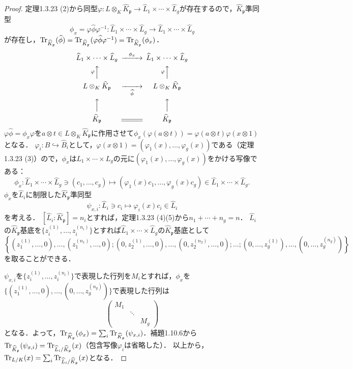 \begin{proof}
  定理1.3.23 (2)から同型$\varphi \colon L \otimes_K \widehat{K}_\mathfrak{p} \to \widehat{L}_1 \times \cdots \times \widehat{L}_g$が存在するので，$\widehat{K}_\mathfrak{p}$準同型
  \[\phi_x=\varphi\widehat{\phi}\varphi^{-1} \colon \widehat{L}_1\times\cdots\times\widehat{L}_g\to \widehat{L}_1\times\cdots\times\widehat{L}_g\]
  が存在し，$\operatorname{Tr}_{\widehat{K}_\mathfrak{p}}(\widehat{\phi})=\operatorname{Tr}_{\widehat{K}_\mathfrak{p}}(\varphi\widehat{\phi}\varphi^{-1})=\operatorname{Tr}_{\widehat{K}_\mathfrak{p}}(\phi_x)$．
  \[
  \begin{CD}
    \widehat{L}_1\times\cdots\times\widehat{L}_g @>{\phi_x}>> \widehat{L}_1\times\cdots\times\widehat{L}_g\\
    @A{\varphi}AA  @A{\varphi}AA\\
    L\otimes_K\widehat{K}_\mathfrak{p} @>>{\widehat{\phi}}> L\otimes_K\widehat{K}_\mathfrak{p}\\
    @AAA @AAA\\
    \widehat{K}_\mathfrak{p} @= \widehat{K}_\mathfrak{p}
  \end{CD}
  \]
  $\varphi\widehat{\phi}=\phi_x\varphi$を$a\otimes t\in L\otimes_K\widehat{K}_\mathfrak{p}$に作用させて$\phi_x(\varphi(a\otimes t)) = \varphi(a\otimes t)\varphi(x\otimes1)$となる．
  $\varphi_i \colon B\hookrightarrow\widehat{B}_i$として，$\varphi(x\otimes1) = (\varphi_1(x), \ldots, \varphi_g(x))$である（定理1.3.23 (3)）ので，$\phi_x$は$L_1\times\cdots\times L_g$の元に$(\varphi_1(x), \ldots, \varphi_g(x))$をかける写像である：
  \[\phi_x\colon\widehat{L}_1\times\cdots\times\widehat{L}_g\ni (c_1,\ldots,c_g)\mapsto(\varphi_1(x)c_1, \ldots, \varphi_g(x)c_g)\in \widehat{L}_1\times\cdots\times\widehat{L}_g.\]
  $\phi_x$を$\widehat{L}_i$に制限した$\widehat{K}_\mathfrak{p}$準同型
  \[\psi_{x,i}\colon\widehat{L}_i\ni c_i\mapsto \varphi_i(x)c_i\in\widehat{L}_i\]
  を考える．
  $[\widehat{L}_i:\widehat{K}_\mathfrak{p}]=n_i$とすれば，定理1.3.23 (4)(5)から$n_1+\cdots+n_g=n$．
  $\widehat{L}_i$の$\widehat{K}_\mathfrak{p}$基底を$\{z_i^{(1)},\ldots,z_i^{(n_i)}\}$とすれば$\widehat{L}_1\times\cdots\times\widehat{L}_g$の$\widehat{K}_\mathfrak{p}$基底として
  \[\left\{(z_1^{(1)},\ldots,0),\ldots,(z_1^{(n_1)},\ldots,0);(0,z_2^{(1)},\ldots,0),\ldots,(0,z_2^{(n_2)},\ldots,0);\ldots;(0,\ldots,z_g^{(1)}),\ldots,(0,\ldots,z_g^{(n_g)})\right\}\]
  を取ることができる．

  $\psi_{x,i}$を$\{z_i^{(1)},\ldots,z_i^{(n_i)}\}$で表現した行列を$M_i$とすれば，$\phi_x$を$\{(z_1^{(1)},\ldots,0),\ldots,(0,\ldots,z_g^{(n_g)})\}$で表現した行列は
  \[
  \begin{pmatrix}
    M_1 &        & \\
    & \ddots & \\
    &        & M_g
  \end{pmatrix}
  \]
  となる．よって，$\operatorname{Tr}_{\widehat{K}_\mathfrak{p}}(\phi_x)=\sum_i\operatorname{Tr}_{\widehat{K}_\mathfrak{p}}(\psi_{x,i})$．補題1.10.6から$\operatorname{Tr}_{\widehat{K}_\mathfrak{p}}(\psi_{x,i})=\operatorname{Tr}_{\widehat{L}_i/\widehat{K}_\mathfrak{p}}(x)$（包含写像$\varphi_i$は省略した）．
  以上から，$\operatorname{Tr}_{L/K}(x)=\sum_i\operatorname{Tr}_{\widehat{L}_i/\widehat{K}_\mathfrak{p}}(x)$となる．
\end{proof}


